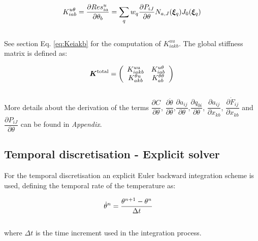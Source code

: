 \documentclass[oneside,11pt,times]{book}
\begin{document}
\begin{equation}
\begin{aligned}
\centering
K_{iab}^{u\theta}=\dfrac{\partial{Res^{u}_{ia}}}{\partial{\theta_{b}}}=\sum_q w_q\dfrac{\partial P_{iJ}}{\partial \theta}
 N_{a,J}(\bm{\xi}_q) J_0(\bm{\xi}_q)
\end{aligned}
\label{equationKuTheta}
\end{equation}
\\
See section Eq. \ref{eq:Keiakb} for the computation of $K_{iakb}^{u u}$. The global stiffness matrix is defined as:

\begin{equation}
\begin{aligned}
\centering
\bm{K}^{\text{total}}=\left( \begin{array}{cc} K_{iakb}^{u u} & K_{iab}^{u\theta} \\
K_{akb}^{\theta u} & K_{ab}^{\theta \theta} \end{array} \right)
\end{aligned}
\label{equationKtotalThetaMecha}
\end{equation}
\\

More details about the derivation of the terms $\dfrac{\partial{C}}{\partial{\theta}}$, $\dfrac{\partial{\dot{\theta}}}{\partial{\theta}}$,$\dfrac{\partial{a_{ij}}}{\partial{\theta}}$,$\dfrac{\partial q_{0i}}{\partial\theta}$, $\dfrac{\partial{{a_{ij}}}}{\partial{x_{kb}}}$, $\dfrac{\partial{{\dot{F}_{ij}}}}{\partial{x_{kb}}}$ and $\dfrac{\partial P_{iJ}}{\partial \theta}$ can be found in \textit{Appendix}. %

\subsection{Temporal discretisation - Explicit solver}

For the temporal discretisation an explicit Euler backward integration scheme is used, defining the temporal rate of the temperature as:

\begin{equation}
\begin{aligned}
\centering
\dot{\theta}^{n}&=\dfrac{\theta^{n+1}-\theta^{n}}{\Delta t}
\end{aligned}
\label{equationPhitimeExp}
\end{equation}
\\
where $\Delta t$ is the time increment used in the integration process.\\
\end{document}
